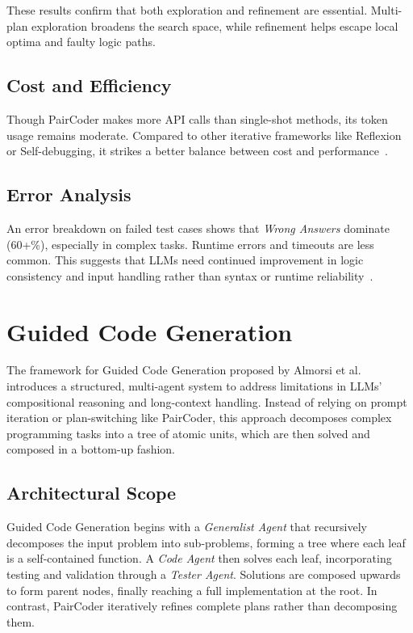 \documentclass[11pt,a4paper]{article}
\begin{document}
These results confirm that both exploration and refinement are essential. Multi-plan exploration broadens the search space, while refinement helps escape local optima and faulty logic paths.

\subsection{Cost and Efficiency}
Though PairCoder makes more API calls than single-shot methods, its token usage remains moderate. Compared to other iterative frameworks like Reflexion or Self-debugging, it strikes a better balance between cost and performance~\cite{zhang2024paircoder}.

\subsection{Error Analysis}
An error breakdown on failed test cases shows that \textit{Wrong Answers} dominate (60+\%), especially in complex tasks. Runtime errors and timeouts are less common. This suggests that LLMs need continued improvement in logic consistency and input handling rather than syntax or runtime reliability~\cite{zhang2024paircoder}.

\section{Guided Code Generation}
The framework for Guided Code Generation proposed by Almorsi et al.\cite{almorsi2025guided} introduces a structured, multi-agent system to address limitations in LLMs' compositional reasoning and long-context handling. Instead of relying on prompt iteration or plan-switching like PairCoder, this approach decomposes complex programming tasks into a tree of atomic units, which are then solved and composed in a bottom-up fashion.

\subsection{Architectural Scope}
Guided Code Generation begins with a \textit{Generalist Agent} that recursively decomposes the input problem into sub-problems, forming a tree where each leaf is a self-contained function. A \textit{Code Agent} then solves each leaf, incorporating testing and validation through a \textit{Tester Agent}. Solutions are composed upwards to form parent nodes, finally reaching a full implementation at the root. In contrast, PairCoder iteratively refines complete plans rather than decomposing them.
\end{document}
